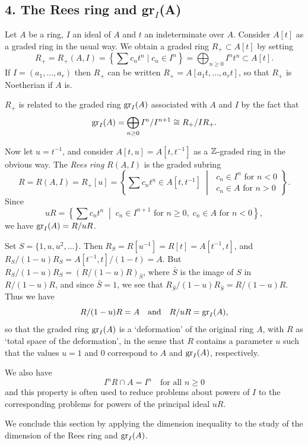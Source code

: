 \subsection*{4. The Rees ring and gr${}_I$(A)}

Let $A$ be a ring, $I$ an ideal of $A$ and $t$ an indeterminate over $A$. Consider
$A[t]$ as a graded ring in the usual way. We obtain a graded ring $R_+ \subset A[t]$
by setting
\[
  R_+ = R_+(A, I) = \left\{\sum c_nt^n \mid c_n \in I^n\right\} = \bigoplus_{n \ge 0} I^nt^n \subset A[t].
\]
If $I = (a_1, \ldots, a_r)$ then $R_+$ can be written $R_+ = A[a_1t, \ldots, a_rt]$, so that $R_+$ is
Noetherian if $A$ is.

$R_+$ is related to the graded ring $\operatorname{gr}_I(A)$ associated with $A$ and $I$ by the fact
that
\[
  \operatorname{gr}_I(A) = \bigoplus_{n \ge 0} I^n/I^{n+1} \cong R_+/IR_+.
\]

Now let $u = t^{-1}$, and consider $A[t, u] = A[t, t^{-1}]$ as a $\mathbb{Z}$-graded ring in
the obvious way. The \emph{Rees ring} $R(A, I)$ is the graded subring
\[
  R = R(A, I) = R_+[u] = \left\{\sum c_nt^n \in A[t, t^{-1}] \;\middle|\;
    \begin{array}{l}
      c_n \in I^n \text{ for } n < 0 \\
      c_n \in A \text{ for } n > 0
    \end{array} \right\}.
\]
Since
\[
  uR = \left\{\sum c_nt^n \;\middle|\; c_n \in I^{n+1} \text{ for } n \ge 0, \; c_n \in A \text{ for } n < 0\right\},
\]
we have $\operatorname{gr}_I(A) = R/uR$.

\smallskip
\noindent Set $S = \{1, u, u^2, \ldots\}$. Then $R_S = R[u^{-1}] = R[t] = A[t^{-1}, t]$, and
$R_S/(1 - u)R_S = A[t^{-1}, t]/(1 - t) = A$. But $R_S/(1 - u)R_S = (R/(1 - u)R)_{\bar{S}}$,
where $\bar{S}$ is the image of $S$ in $R/(1 - u)R$, and since $\bar{S} = 1$, we see that
$R_{\bar{S}}/(1 - u)R_{\bar{S}} = R/(1 - u)R$. Thus we have
\[
  R/(1 - u)R = A \quad \text{and} \quad R/uR = \operatorname{gr}_I(A),
\]
so that the graded ring $\operatorname{gr}_I(A)$ is a `deformation' of the original ring $A$,
with $R$ as `total space of the deformation', in the sense that $R$ contains a
parameter $u$ such that the values $u = 1$ and $0$ correspond to $A$ and $\operatorname{gr}_I(A)$,
respectively.

We also have
\[
  I^nR \cap A = I^n \quad \text{for all } n \ge 0
\]
and this property is often used to reduce problems about powers of $I$ to
the corresponding problems for powers of the principal ideal $uR$.

We conclude this section by applying the dimension inequality to the
study of the dimension of the Rees ring and $\operatorname{gr}_I(A)$.


